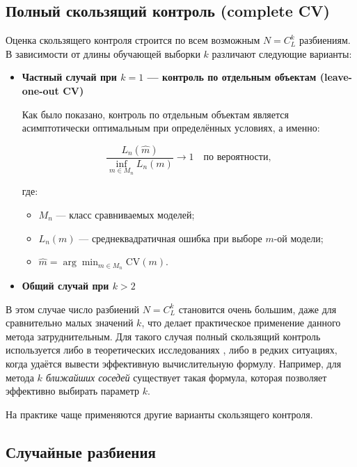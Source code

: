 \subsection{Полный скользящий контроль (complete CV)}
Оценка скользящего контроля строится по всем возможным $N = C_L^k$ разбиениям. В зависимости от длины обучающей выборки $k$ различают следующие варианты:
\begin{itemize}

    \item \textbf{Частный случай при $k=1$ — контроль по отдельным объектам (leave-one-out CV)}

          Как было показано, контроль по отдельным объектам является асимптотически оптимальным при определённых условиях, а именно:

          \[
              \frac{L_n(\hat{m})}{\inf_{m \in M_n} L_n(m)} \to 1 \quad \text{по вероятности},
          \]

          где:

          \begin{itemize}
              \item $M_n$ — класс сравниваемых моделей;
              \item $L_n(m)$ — среднеквадратичная ошибка при выборе $m$-ой модели;
              \item $\hat{m} = \arg \min_{m \in M_n} \text{CV}(m)$.
          \end{itemize}

    \item \textbf{Общий случай при $k>2$}
\end{itemize}

В этом случае число разбиений $N = C_L^k$ становится очень большим, даже для сравнительно малых значений $k$, что делает практическое применение данного метода затруднительным. Для такого случая полный скользящий контроль используется либо в теоретических исследованиях \cite{Voronov2004}, либо в редких ситуациях, когда удаётся вывести эффективную вычислительную формулу. Например, для метода \textit{$k$ ближайших соседей} существует такая формула, которая позволяет эффективно выбирать параметр $k$.

\medskip
На практике чаще применяются другие варианты скользящего контроля.

\subsection{Случайные разбиения}

